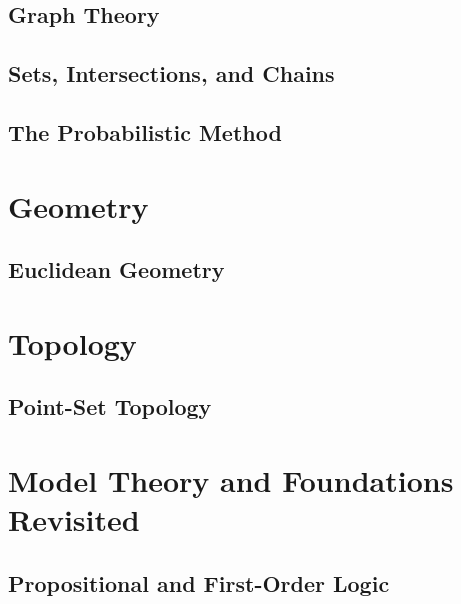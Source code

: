 \documentclass[oneside,openany]{book}
\theoremstyle{definition}
\begin{document}
\chapter{Graph Theory}


\chapter{Sets, Intersections, and Chains}


\chapter{The Probabilistic Method}



\part{Geometry}

\chapter{Euclidean Geometry}



\part{Topology}
\chapter{Point-Set Topology}



\part{Model Theory and Foundations Revisited}

\chapter{Propositional and First-Order Logic}

\end{document}
